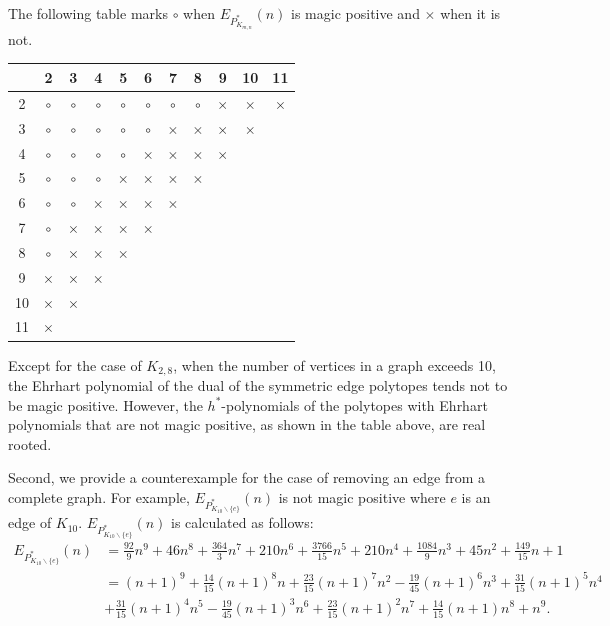 \documentclass[a4paper,reqno,11pt, oneside]{amsart}
\theoremstyle{definition}
\theoremstyle{remark}
\begin{document}
The following table marks $\circ$ when $E_{P_{K_{m,n}}^\ast}(n)$ is magic positive and $\times$ when it is not.

\begin{table}[H]
  \centering
  \begin{tabular}{|c|c|c|c|c|c|c|c|c|c|c|} 
      \hline
      & 2 & 3 & 4 & 5 & 6 & 7 & 8 & 9 & 10 & 11\\ 
      \hline
      2 & $\circ$ & $\circ$ & $\circ$ & $\circ$ & $\circ$ & $\circ$ & $\circ$ & $\times$ & $\times$ & $\times$ \\ 
      \hline
      3 & $\circ$ & $\circ$ & $\circ$ & $\circ$ & $\circ$ & $\times$ & $\times$ & $\times$ & $\times$  &\\ 
      \hline
      4 & $\circ$ & $\circ$ & $\circ$ & $\circ$ & $\times$ & $\times$ & $\times$ & $\times$ &  & \\ 
      \hline
      5 & $\circ$ & $\circ$ & $\circ$ & $\times$ & $\times$ & $\times$ & $\times$ &  &  & \\ 
      \hline
      6 & $\circ$ & $\circ$ & $\times$ & $\times$ & $\times$ & $\times$ &  &  &  & \\ 
      \hline
      7 & $\circ$ & $\times$ & $\times$ & $\times$ & $\times$ &  &  &  &  & \\ 
      \hline
      8 & $\circ$ & $\times$ & $\times$ & $\times$ &  &  &  &  &  & \\ 
      \hline
      9 & $\times$ & $\times$ & $\times$ &  &  &  &  &  &  & \\ 
      \hline
      10 & $\times$ & $\times$ &  &  &  &  &  &  &  &\\ 
      \hline
      11 & $\times$ &  &  &  &  &  &  &  &  &\\ 
      \hline
   \end{tabular}
\end{table}


Except for the case of $K_{2,8}$, when the number of vertices in a graph exceeds 10, the Ehrhart polynomial of the dual of the symmetric edge polytopes tends not to be magic positive. However, the $h^\ast$-polynomials of the polytopes with Ehrhart polynomials that are not magic positive, as shown in the table above, are real rooted.

Second, we provide a counterexample for the case of removing an edge from a complete graph. For example, $E_{P_{K_{10} \backslash \{e\}}^\ast}(n)$ is not magic positive where $e$ is an edge of $K_{10}$. $E_{P_{K_{10} \backslash \{e\}}^\ast}(n)$ is calculated as follows:
\begin{align*}
E_{P_{K_{10} \backslash \{e\}}^\ast}(n) &= \frac{92}{9}n^9 + 46n^8 + \frac{364}{3}n^7 + 210n^6 + \frac{3766}{15}n^5 + 210n^4 + \frac{1084}{9}n^3 + 45n^2 + \frac{149}{15}n + 1 \\
&= (n+1)^9 + \frac{14}{15}(n+1)^8n + \frac{23}{15}(n+1)^7n^2 -\frac{19}{45}(n+1)^6n^3 + \frac{31}{15}(n+1)^5n^4 \\
&+ \frac{31}{15}(n+1)^4n^5 -\frac{19}{45}(n+1)^3n^6 + \frac{23}{15}(n+1)^2n^7 + \frac{14}{15}(n+1)n^8 + n^9.
\end{align*}
\end{document}
